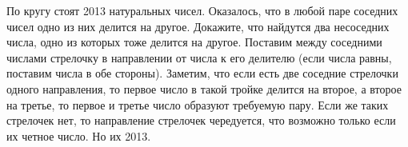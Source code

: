 \problem
По кругу стоят 2013 натуральных чисел.
Оказалось, что в любой паре соседних чисел одно из них делится на другое.
Докажите, что найдутся два несоседних числа, одно из которых тоже делится на
другое.
\solution
Поставим между соседними числами стрелочку в направлении от числа к его
делителю (если числа равны, поставим числа в обе стороны).
Заметим, что если есть две соседние стрелочки одного направления, то первое
число в такой тройке делится на второе, а второе на третье, то первое и третье
число образуют требуемую пару.
Если же таких стрелочек нет, то направление стрелочек чередуется, что возможно
только если их четное число.
Но их 2013.
\endproblem

